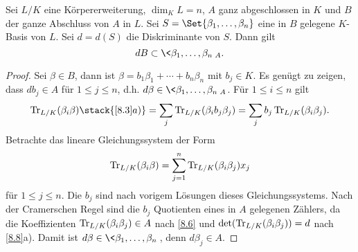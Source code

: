 \begin{lem} \label{8.9}
	Sei $L / K$ eine Körpererweiterung, $\dim_K L = n$, $A$ ganz abgeschlossen in $K$ und $B$ der ganze Abschluss von $A$ in $L$.
	Sei $S = \Set{\beta_1, \dotsc, \beta_n}$ eine in $B$ gelegene $K$-Basis von $L$.
	Sei $d = d(S)$ die Diskriminante von $S$.
	Dann gilt
	\[
		d B \subset \< \beta_1, \dotsc, \beta_n\>_A.
	\]
	\begin{proof}
		Sei $\beta \in B$, dann ist $\beta = b_1 \beta_1 + \dotsb + b_n \beta_n$ mit $b_j \in K$.
		Es genügt zu zeigen, dass $db_j \in A$ für $1 \le j \le n$, d.h. $d \beta \in \< \beta_1, \dotsc, \beta_n\>_A$.
		Für $1 \le i \le n$ gilt
		\[
			\Tr_{L/K}(\beta_i\beta)
			\stack{\ref{8.3}a)}= \sum_{j} \Tr_{L/K} (\beta_i b_j \beta_j)
			= \sum_{j} b_j \Tr_{L/K}(\beta_i \beta_j).
		\]
		Betrachte das lineare Gleichungssystem der Form
		\[
			\operatorname{Tr}_{L/K}(\beta_i\beta) = \sum_{j=1}^n \operatorname{Tr}_{L/K}(\beta_i\beta_j) x_j
		\]
		für $1 \le j \le n$.
		Die $b_j$ sind nach vorigem Lösungen dieses Gleichungssystems.
		Nach der Cramerschen Regel sind die $b_j$ Quotienten eines in $A$ gelegenen Zählers, da die Koeffizienten $\operatorname{Tr}_{L/K}(\beta_i\beta_j) \in A$ nach \ref{8.6} und $\det(\operatorname{Tr}_{L/K}(\beta_i\beta_j)) = d$ nach \ref{8.8}a).
		Damit ist $d\beta \in \<\beta_1, \dotsc, \beta_n\>$, denn $d \beta_j \in A$.
	\end{proof}
\end{lem}

